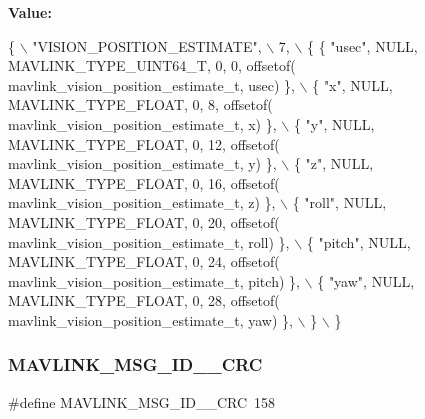 {\bfseries Value\+:}
\begin{DoxyCode}
\{ \(\backslash\)
    \textcolor{stringliteral}{"VISION\_POSITION\_ESTIMATE"}, \(\backslash\)
    7, \(\backslash\)
    \{  \{ \textcolor{stringliteral}{"usec"}, NULL, MAVLINK_TYPE_UINT64_T, 0, 0, offsetof(
      mavlink_vision_position_estimate_t, usec) \}, \(\backslash\)
         \{ \textcolor{stringliteral}{"x"}, NULL, MAVLINK_TYPE_FLOAT, 0, 8, offsetof(
      mavlink_vision_position_estimate_t, x) \}, \(\backslash\)
         \{ \textcolor{stringliteral}{"y"}, NULL, MAVLINK_TYPE_FLOAT, 0, 12, offsetof(
      mavlink_vision_position_estimate_t, y) \}, \(\backslash\)
         \{ \textcolor{stringliteral}{"z"}, NULL, MAVLINK_TYPE_FLOAT, 0, 16, offsetof(
      mavlink_vision_position_estimate_t, z) \}, \(\backslash\)
         \{ \textcolor{stringliteral}{"roll"}, NULL, MAVLINK_TYPE_FLOAT, 0, 20, offsetof(
      mavlink_vision_position_estimate_t, roll) \}, \(\backslash\)
         \{ \textcolor{stringliteral}{"pitch"}, NULL, MAVLINK_TYPE_FLOAT, 0, 24, offsetof(
      mavlink_vision_position_estimate_t, pitch) \}, \(\backslash\)
         \{ \textcolor{stringliteral}{"yaw"}, NULL, MAVLINK_TYPE_FLOAT, 0, 28, offsetof(
      mavlink_vision_position_estimate_t, yaw) \}, \(\backslash\)
         \} \(\backslash\)
\}
\end{DoxyCode}
\mbox{\label{mavlink__msg__vision__position__estimate_8h_adea85f6c7956c66c991e71c57ed87ab2}} 
\subsubsection{M\+A\+V\+L\+I\+N\+K\+\_\+\+M\+S\+G\+\_\+\+I\+D\+\_\+\_\+\+C\+RC}
{\footnotesize\ttfamily \#define M\+A\+V\+L\+I\+N\+K\+\_\+\+M\+S\+G\+\_\+\+I\+D\+\_\+\_\+\+C\+RC~158}

\mbox{\label{mavlink__msg__vision__position__estimate_8h_a3798ed00398a3798cdd7178b19450f94}} 
